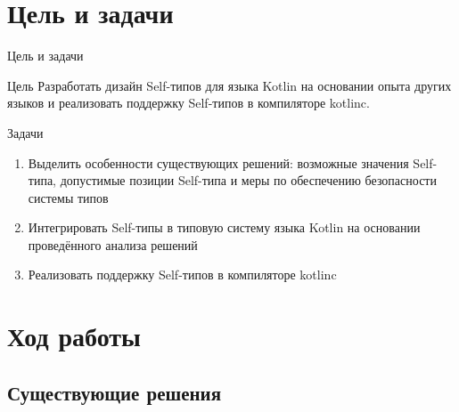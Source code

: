 \documentclass[usenames, dvipsnames]{beamer}
\begin{document}
    \section{Цель и задачи}

    \begin{frame}{Цель и задачи}
        \begin{block}{Цель}
            Разработать дизайн Self-типов для языка Kotlin на основании опыта других языков и реализовать поддержку Self-типов в компиляторе kotlinc.
        \end{block}

        \begin{block}{Задачи}
            \begin{enumerate}
                \item Выделить особенности существующих решений: возможные значения Self-типа, допустимые позиции Self-типа и меры по обеспечению безопасности системы типов
                \item Интегрировать Self-типы в типовую систему языка Kotlin на основании проведённого анализа решений
                \item Реализовать поддержку Self-типов в компиляторе kotlinc
            \end{enumerate}
        \end{block}
    \end{frame}


    \section{Ход работы}


    \subsection{Существующие решения}
\end{document}
